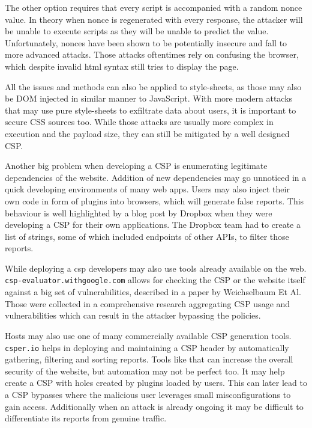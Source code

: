 \documentclass[12]{article}   %
\begin{document}
The other option requires that every script is accompanied with a random nonce value.
In theory when nonce is regenerated with every response, the attacker will be unable to execute scripts as they will be unable to predict the value.
Unfortunately, nonces have been shown to be potentially insecure and fall to more advanced attacks. \cite{noncesGoBrrr}
Those attacks oftentimes rely on confusing the browser, which despite invalid html syntax still tries to display the page.

All the issues and methods can also be applied to style-sheets, as those may also be DOM injected in similar manner to JavaScript. \cite{cssinjection} \cite{cssexfil}
With more modern attacks that may use pure style-sheets to exfiltrate data about users, it is important to secure CSS sources too.
While those attacks are usually more complex in execution and the payload size, they can still be mitigated by a well designed CSP.

Another big problem when developing a CSP is enumerating legitimate dependencies of the website.
Addition of new dependencies may go unnoticed in a quick developing environments of many web apps.
Users may also inject their own code in form of plugins into browsers, which will generate false reports.
This behaviour is well highlighted by a blog post by Dropbox when they were developing a CSP for their own applications. \cite{dropboxcsp}
The Dropbox team had to create a list of strings, some of which included endpoints of other APIs, to filter those reports.

While deploying a csp developers may also use tools already available on the web. \\ 
\texttt{csp-evaluator.withgoogle.com} allows for checking the CSP or the website itself against a big set of vulnerabilities, described in a paper by Weichselbaum Et Al. \cite{weichselbaum2016csp}
Those were collected in a comprehensive research aggregating CSP usage and vulnerabilities which can result in the attacker bypassing the policies.

Hosts may also use one of many commercially available CSP generation tools.
\texttt{csper.io} helps in deploying and maintaining a CSP header by automatically gathering, filtering and sorting reports. 
Tools like that can increase the overall security of the website, but automation may not be perfect too. 
It may help create a CSP with holes created by plugins loaded by users.
This can later lead to a CSP bypasses where the malicious user leverages small misconfigurations to gain access.
Additionally when an attack is already ongoing it may be difficult to differentiate its reports from genuine traffic.
\end{document}
